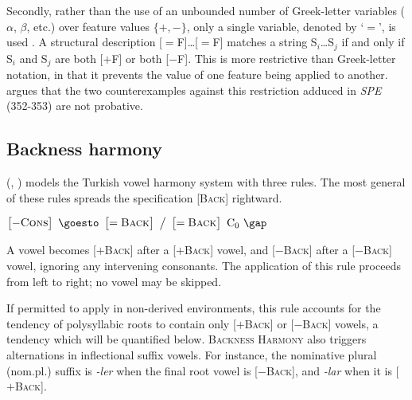 Secondly, rather than the use of an unbounded number of Greek-letter variables ($\alpha$, $\beta$, etc.) over feature values $\{+, -\}$, only a single variable, denoted by `$=$', is used \citep{McCawley1973}. A structural description [$=$F]\ldots{}[$=$F] matches a string S$_i$\ldots{}S$_j$ if and only if S$_i$ and S$_j$ are both [$+$F] or both [$-$F]. This is more restrictive than Greek-letter notation, in that it prevents the value of one feature being applied to another. \citet{Odden2012} argues that the two counterexamples against this restriction adduced in \emph{SPE} (352-353) are not probative.

\subsection{Backness harmony}

\citeauthor{Lees1966b} (\citeyear[35]{Lees1966b}, \citeyear[284]{Lees1966a}) models the Turkish vowel harmony system with three rules. The most general of these rules spreads the specification [\textsc{Back}] rightward.

\begin{example}
$\begin{bmatrix} -\textsc{Cons} \end{bmatrix}~\goesto~\begin{bmatrix} =\textsc{Back} \end{bmatrix}~\big /~\begin{bmatrix} =\textsc{Back} \end{bmatrix}~\textrm{C}_0~\gap$
\end{example}

\noindent
A vowel becomes [$+$\textsc{Back}] after a [$+$\textsc{Back}] vowel, and [$-$\textsc{Back}] after a [$-$\textsc{Back}] vowel, ignoring any intervening consonants. The application of this rule proceeds from left to right; no vowel may be skipped.

If permitted to apply in non-derived environments, this rule accounts for the tendency of polysyllabic roots to contain only [$+$\textsc{Back}] or [$-$\textsc{Back}] vowels, a tendency which will be quantified below. \textsc{Backness Harmony} also triggers alternations in inflectional suffix vowels. For instance, the nominative plural (nom.pl.) suffix is \emph{-ler} when the final root vowel is [$-$\textsc{Back}], and \emph{-lar} when it is [$+$\textsc{Back}].

